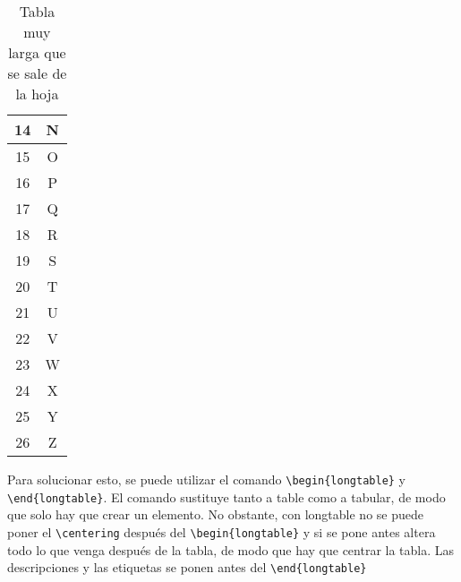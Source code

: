 \begin{table}[H]
\begin{tabular}{|c|c|}
		\hline
		14 & N \\
		\hline
		15 & O \\
		\hline
		16 & P \\
		\hline
		17 & Q \\
		\hline
		18 & R \\
		\hline
		19 & S \\
		\hline
		20 & T \\
		\hline
		21 & U \\
		\hline
		22 & V \\
		\hline
		23 & W \\
		\hline
		24 & X \\
		\hline
		25 & Y \\
		\hline
		26 & Z \\
		\hline
	\end{tabular}
	\caption[Tabla muy larga]{Tabla muy larga que se sale de la hoja}
	\label{table_3}
\end{table}

Para solucionar esto, se puede utilizar el comando \verb!\begin{longtable}! y \verb!\end{longtable}!. El comando sustituye tanto a table como a tabular, de modo que solo hay que crear un elemento. No obstante, con longtable no se puede poner el \verb!\centering! después del \verb!\begin{longtable}! y si se pone antes altera todo lo que venga después de la tabla, de modo que hay que centrar la tabla. Las descripciones y las etiquetas se ponen antes del \verb!\end{longtable}!


